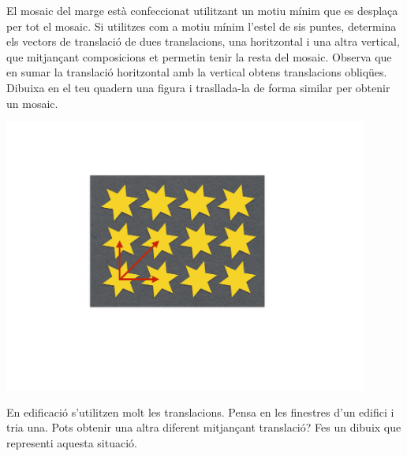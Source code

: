 \begin{mylist}
	\vspace{-2.5cm}
	\exer \begin{minipage}[t]{0.7\textwidth}
		El mosaic del marge està confeccionat utilitzant un motiu mínim que es desplaça per tot el mosaic. Si utilitzes com a motiu mínim l'estel de sis puntes,  determina els vectors de translació de dues translacions, una horitzontal i una altra vertical, que mitjançant composicions et permetin tenir la resta del mosaic. Observa que en sumar la translació horitzontal amb la vertical obtens translacions obliqües. Dibuixa en el teu quadern una figura i trasllada-la de forma similar per obtenir un mosaic.
	\end{minipage}
	\begin{minipage}{0.24\textwidth}
		\centering
		\vspace{2.5cm}
		\includegraphics[width=0.9\textwidth]{img-10/mosaic}
	\end{minipage}
	
	
	
	\exer  En edificació s'utilitzen molt les translacions. Pensa en les finestres d'un edifici i tria una. Pots obtenir una altra diferent mitjançant translació? Fes un dibuix que representi aquesta situació.
	
	
	
	
\end{mylist}


